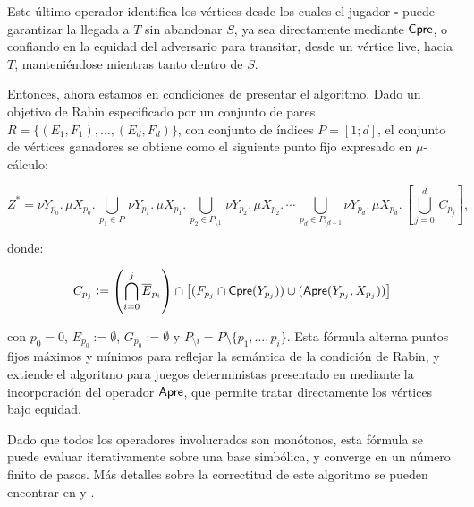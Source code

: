 Este último operador identifica los vértices desde los cuales el jugador \(
\square \) puede garantizar la llegada a \( T \) sin abandonar \( S \), ya sea
directamente mediante \( \textsf{Cpre} \), o confiando en la equidad del adversario
para transitar, desde un vértice live, hacia \( T \), manteniéndose mientras
tanto dentro de \( S \).

Entonces, ahora estamos en condiciones de presentar el algoritmo. Dado un
objetivo de Rabin especificado por un conjunto de pares $R = \{(E_1, F_1),
	\dots, (E_d, F_d)\}$, con conjunto de índices $P = [1;d]$, el conjunto de
vértices ganadores se obtiene como el siguiente punto fijo expresado en
$\mu$-cálculo:

\[
	Z^* = \nu Y_{p_0}.\, \mu X_{p_0}.\, \bigcup_{p_1 \in P}\, \nu Y_{p_1}.\, \mu X_{p_1}.\, \bigcup_{p_2 \in P_{\setminus 1}}\, \nu Y_{p_2}.\, \mu X_{p_2} .\, \cdots\, \bigcup_{p_d \in P_{\setminus d-1}} \nu Y_{p_d}.\, \mu X_{p_d}.\, \left[ \bigcup_{j=0}^d\, C_{p_j} \right],
\]

donde:

\[
	C_{p_j} := \left( \bigcap_{i=0}^j \overline{E}_{p_i} \right) \cap \left[ (F_{p_j} \cap \textsf{Cpre}(Y_{p_j})) \cup (\textsf{Apre}(Y_{p_j}, X_{p_j})) \right]
\]

con $p_0 = 0$, \( E_{p_0} := \emptyset \), $G_{p_0} := \emptyset$ y
$P_{\setminus i} = P \setminus \{p_1, \dots, p_i\}$. Esta fórmula alterna
puntos fijos máximos y mínimos para reflejar la semántica de la condición de
Rabin, y extiende el algoritmo para juegos deterministas presentado en
\cite{Piterman} mediante la incorporación del operador \( \textsf{Apre} \), que permite
tratar directamente los vértices bajo equidad.

Dado que todos los operadores involucrados son monótonos, esta fórmula se puede
evaluar iterativamente sobre una base simbólica, y converge en un número finito
de pasos. Más detalles sobre la correctitud de este algoritmo se pueden
encontrar en \cite{Banerjee} y \cite{Piterman}.


